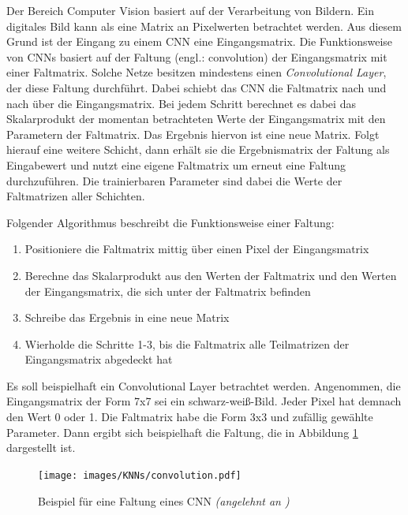 Der Bereich Computer Vision basiert auf der Verarbeitung von Bildern. Ein digitales Bild kann als eine Matrix an Pixelwerten betrachtet werden. Aus diesem Grund ist der Eingang zu einem \ac{CNN} eine Eingangsmatrix. Die Funktionsweise von \acp{CNN} basiert auf der Faltung (engl.: convolution) der Eingangsmatrix mit einer Faltmatrix. Solche Netze besitzen mindestens einen \emph{Convolutional Layer}, der diese Faltung durchführt. Dabei schiebt das \ac{CNN} die Faltmatrix nach und nach über die Eingangsmatrix. Bei jedem Schritt berechnet es dabei das Skalarprodukt der momentan betrachteten Werte der Eingangsmatrix mit den Parametern der Faltmatrix. Das Ergebnis hiervon ist eine neue Matrix. Folgt hierauf eine weitere Schicht, dann erhält sie die Ergebnismatrix der Faltung als Eingabewert und nutzt eine eigene Faltmatrix um erneut eine Faltung durchzuführen. Die trainierbaren Parameter sind dabei die Werte der Faltmatrizen aller Schichten. \cite{DeepLearningBook}

Folgender Algorithmus beschreibt die Funktionsweise einer Faltung: \cite{DeepLearningBook}
\begin{enumerate}
   \item Positioniere die Faltmatrix mittig über einen Pixel der Eingangsmatrix
   \item Berechne das Skalarprodukt aus den Werten der Faltmatrix und den Werten der Eingangsmatrix, die sich unter der Faltmatrix befinden
   \item Schreibe das Ergebnis in eine neue Matrix
   \item Wierholde die Schritte 1-3, bis die Faltmatrix alle Teilmatrizen der Eingangsmatrix abgedeckt hat
\end{enumerate}

Es soll beispielhaft ein Convolutional Layer betrachtet werden. Angenommen, die Eingangsmatrix der Form 7x7 sei ein schwarz-weiß-Bild. Jeder Pixel hat demnach den Wert 0 oder 1. Die Faltmatrix habe die Form 3x3 und zufällig gewählte Parameter. Dann ergibt sich beispielhaft die Faltung, die in Abbildung \ref{fig:convolution} dargestellt ist.


\begin{figure}[h]
      \centering
      \texttt{[image: images/KNNs/convolution.pdf]}
      \caption{Beispiel für eine Faltung eines \ac{CNN} \emph{(angelehnt an \cite{cnn-img})}}
      \label{fig:convolution}
\end{figure}

